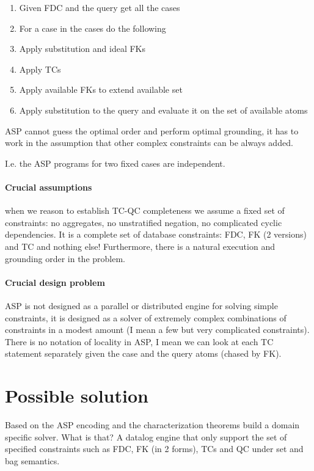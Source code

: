 \documentclass{article}
\begin{document}
\begin{enumerate}
  \item Given FDC and the query get all the cases
  \item For a case in the cases do the following
  \item Apply substitution and ideal FKs
  \item Apply TCs 
  \item Apply available FKs to extend available set
  \item Apply substitution to the query and evaluate it on the set of available atoms
\end{enumerate}

ASP cannot guess the optimal order and perform optimal grounding, it has to work in the assumption that other complex constraints can be always added.

I.e. the ASP programs for two fixed cases are independent. 

\paragraph{Crucial assumptions} when we reason to establish TC-QC completeness we assume a fixed set of constraints: no aggregates, no unstratified negation, no complicated cyclic dependencies. It is a complete set of database constraints: FDC, FK (2 versions) and TC and nothing else! Furthermore, there is a natural execution and grounding order in the problem.

\paragraph{Crucial design problem} ASP is not designed as a parallel or distributed engine for solving simple constraints, it is designed as a solver of extremely complex combinations of constraints in a modest amount (I mean a few but very complicated constraints). There is no notation of locality in ASP, I mean we can look at each TC statement separately given the case and the query atoms (chased by FK).

\section{Possible solution} 
Based on the ASP encoding and the characterization theorems build a domain specific solver. What is that? A datalog engine that only support the set of specified constraints such as FDC, FK (in 2 forms), TCs and QC under set and bag semantics.
\end{document}
